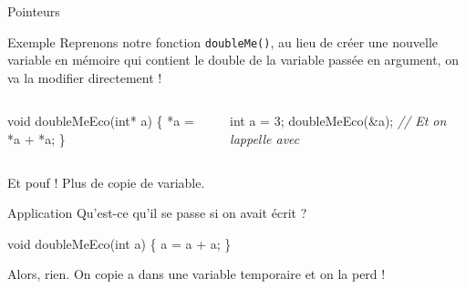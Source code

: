 \documentclass[
  10pt,
  french,
  ignorenonframetext,
  aspectratio=169,
]{beamer}
\newenvironment{Shaded}{}{}
\newcommand{\CommentTok}[1]{\textcolor[rgb]{0.38,0.63,0.69}{\textit{#1}}}
\newcommand{\DataTypeTok}[1]{\textcolor[rgb]{0.56,0.13,0.00}{#1}}
\newcommand{\DecValTok}[1]{\textcolor[rgb]{0.25,0.63,0.44}{#1}}
\newcommand{\NormalTok}[1]{#1}
\newcommand{\OperatorTok}[1]{\textcolor[rgb]{0.40,0.40,0.40}{#1}}
\begin{document}
\begin{frame}[fragile]{Pointeurs}
\protect\hypertarget{pointeurs-2}{}
\begin{block}{Exemple}
\protect\hypertarget{exemple}{}
Reprenons notre fonction \texttt{doubleMe()}, au lieu de créer une
nouvelle variable en mémoire qui contient le double de la variable
passée en argument, on va la modifier directement !

\begin{columns}[T]
\begin{column}{0.48\textwidth}
\begin{Shaded}
\begin{Highlighting}[]
\DataTypeTok{void}\NormalTok{ doubleMeEco}\OperatorTok{(}\DataTypeTok{int}\OperatorTok{*}\NormalTok{ a}\OperatorTok{)} \OperatorTok{\{}
    \OperatorTok{*}\NormalTok{a }\OperatorTok{=} \OperatorTok{*}\NormalTok{a }\OperatorTok{+} \OperatorTok{*}\NormalTok{a}\OperatorTok{;}
\OperatorTok{\}}
\end{Highlighting}
\end{Shaded}
\end{column}

\begin{column}{0.48\textwidth}
\begin{Shaded}
\begin{Highlighting}[]
\DataTypeTok{int}\NormalTok{ a }\OperatorTok{=}  \DecValTok{3}\OperatorTok{;}
\NormalTok{doubleMeEco}\OperatorTok{(\&}\NormalTok{a}\OperatorTok{);} \CommentTok{// Et on l\textquotesingle{}appelle avec }
\end{Highlighting}
\end{Shaded}
\end{column}
\end{columns}

Et pouf ! Plus de copie de variable.
\end{block}

\begin{block}{Application}
\protect\hypertarget{application}{}
Qu'est-ce qu'il se passe si on avait écrit ?

\begin{Shaded}
\begin{Highlighting}[]
\DataTypeTok{void}\NormalTok{ doubleMeEco}\OperatorTok{(}\DataTypeTok{int}\NormalTok{ a}\OperatorTok{)} \OperatorTok{\{}
\NormalTok{    a }\OperatorTok{=}\NormalTok{ a }\OperatorTok{+}\NormalTok{ a}\OperatorTok{;}
\OperatorTok{\}}
\end{Highlighting}
\end{Shaded}

Alors, rien. On copie a dans une variable temporaire et on la perd !
\end{block}
\end{frame}
\end{document}
